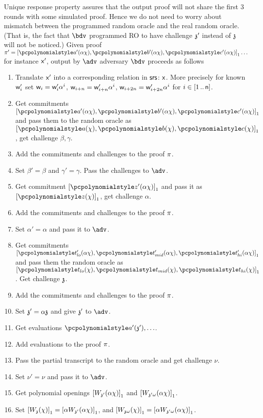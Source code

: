 \documentclass[runningheads,11pt]{llncs}
\begin{document}
\begin{enumerate}
  Unique response property assures that the output proof will not share the
  first 3 rounds with some simulated proof. Hence we do not need to worry about
  mismatch between the programmed random oracle and the real random
  oracle. (That is, the fact that $\bdv$ programmed RO to have challenge $\mathfrak{z}'$
  instead of $\mathfrak{z}$ will not be noticed.)  Given proof
  $\zkproof' = \gone{\p{a'} (\alpha \chi), \p{b'} (\alpha \chi), \p{c'} (\alpha
    \chi)} \ldots$ for instance $\mathsf{x}'$, output by $\adv$ adversary $\bdv$
  proceeds as follows
  \begin{enumerate}
  \item Translate $\mathsf{x}'$ into a corresponding relation in $\mathsf{srs}$: $\mathsf{x}$. More
    precisely for known $\mathsf{w}'_i$ set $\mathsf{w}_i = \mathsf{w}'_i \alpha^i$,
    $\mathsf{w}_{i + n} = \mathsf{w}'_{i + n} \alpha^i$,
    $\mathsf{w}_{i + 2n} = \mathsf{w}'_{i + 2n} \alpha^i$ for $i \in [1 \, .. \, \mathsf{n}]$.
  \item Get commitments $\gone{\p{a'} (\alpha \chi), \p{b'} (\alpha \chi), \p{c'} (\alpha
      \chi)}$ and pass them to the random oracle as $\gone{\p{a} (\chi), \p{b} (\chi),
    \p{c} (\chi)}$, get challenge $\beta, \gamma$. 
\item Add the commitments and challenges to the proof $\pi$.
  \item Set $\beta' = \beta$ and $\gamma' = \gamma$. Pass the challenges to $\adv$.
  \item Get commitment $\gone{\p{z'} (\alpha \chi)}$ and pass it as
    $\gone{\p{z} (\chi)}$, get challenge $\alpha$.
  \item Add the commitments and challenges to the proof $\pi$.
  \item Set $\alpha' = \alpha$ and pass it to $\adv$.
  \item Get commitments
    $\gone{\p{t'_{lo}} (\alpha \chi), \p{t'_{mid}} (\alpha \chi), \p{t'_{hi}}
    (\alpha \chi)}$ and pass them the random oracle as
    $\gone{\p{t_{lo}} (\chi), \p{t_{mid}} (\chi), \p{t_{hi}} (\chi)}$. Get
    challenge $\mathfrak{z}$.
  \item Add the commitments and challenges to the proof $\pi$.
  \item Set $\mathfrak{z}' = \alpha \mathfrak{z}$ and give $\mathfrak{z}'$ to $\adv$.
  \item Get evaluations $\p{a'} (\chz'), \ldots$.
  \item Add evaluations to the proof $\pi$.
  \item Pass the partial transcript to the random oracle and get challenge $\nu$.
  \item Set $\nu' = \nu$ and pass it to $\adv$.
  \item Get polynomial openings $\left[W_{\mathfrak{z}'} (\alpha \chi)\right]_{1}$ and $\left[W_{{\mathfrak{z}'}
        \omega} (\alpha \chi)\right]_{1}$.
  \item Set $\left[W_{\mathfrak{z}} (\chi)\right]_{1} = \left[\alpha W_{\mathfrak{z}'} (\alpha \chi)\right]_{1}$, and
    $\left[W_{\mathfrak{z} \omega} (\chi)\right]_{1} = \left[\alpha W_{{\mathfrak{z}'}
        \omega} (\alpha \chi)\right]_{1}$.
  \end{enumerate}
\end{enumerate}
\end{document}
